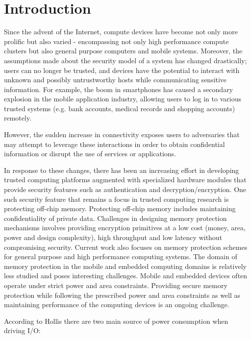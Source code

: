 \section{Introduction}
\label{sec-introduction}

Since the advent of the Internet, compute devices have become not only more
prolific but also varied - encompassing not only high performance compute
clusters but also general purpose computers and mobile systems.  Moreover, the
assumptions made about the security model of a system has changed drastically;
users can no longer be trusted, and devices have the potential to interact with
unknown and possibly untrustworthy hosts while communicating sensitive
information. For example, the boom in smartphones has caused a secondary
explosion in the mobile application industry, allowing users to log in to
various trusted systems (e.g. bank accounts, medical records and shopping
accounts) remotely.

However, the sudden increase in connectivity exposes users to adversaries that
may attempt to leverage these interactions in order to obtain confidential
information or disrupt the use of services or applications.

In response to these changes, there has been an increasing effort in developing
trusted computing platforms augmented with specialized hardware modules that
provide security features such as authentication and decryption/encryption. One
such security feature that remains a focus in trusted computing research is
protecting off-chip memory. Protecting off-chip memory includes maintaining
confidentiality of private data. Challenges in designing memory protection
mechanisms involves providing encryption primitives at a low cost (money, area,
power and design complexity), high throughput and low latency without
compromising security. Current work also focuses on memory protection schemes
for general purpose and high performance computing systems.  The domain of
memory protection in the mobile and embedded computing domains is relatively
less studied and poses interesting challenges.  Mobile and embedded devices
often operate under strict power and area constraints. Providing secure memory
protection while following the prescribed power and area constraints as well as
maintaining performance of the computing devices is an ongoing challenge.

According to Hollis \cite{hollis} there are two main source of power
consumption when driving I/O:

